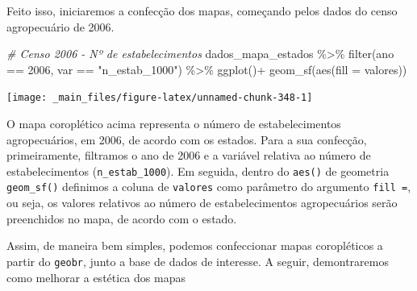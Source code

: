 \documentclass[
  brazilian,
]{book}
\newenvironment{Shaded}{\begin{snugshade}}{\end{snugshade}}
\newcommand{\AttributeTok}[1]{\textcolor[rgb]{0.77,0.63,0.00}{#1}}
\newcommand{\CommentTok}[1]{\textcolor[rgb]{0.56,0.35,0.01}{\textit{#1}}}
\newcommand{\DecValTok}[1]{\textcolor[rgb]{0.00,0.00,0.81}{#1}}
\newcommand{\FunctionTok}[1]{\textcolor[rgb]{0.00,0.00,0.00}{#1}}
\newcommand{\NormalTok}[1]{#1}
\newcommand{\SpecialCharTok}[1]{\textcolor[rgb]{0.00,0.00,0.00}{#1}}
\newcommand{\StringTok}[1]{\textcolor[rgb]{0.31,0.60,0.02}{#1}}
\begin{document}
Feito isso, iniciaremos a confecção dos mapas, começando pelos dados do censo agropecuário de 2006.

\begin{Shaded}
\begin{Highlighting}[]
\CommentTok{\# Censo 2006 {-} Nº de estabelecimentos}
\NormalTok{dados\_mapa\_estados }\SpecialCharTok{\%\textgreater{}\%} 
  \FunctionTok{filter}\NormalTok{(ano }\SpecialCharTok{==} \DecValTok{2006}\NormalTok{,}
\NormalTok{         var }\SpecialCharTok{==} \StringTok{"n\_estab\_1000"}\NormalTok{) }\SpecialCharTok{\%\textgreater{}\%} 
  \FunctionTok{ggplot}\NormalTok{()}\SpecialCharTok{+}
  \FunctionTok{geom\_sf}\NormalTok{(}\FunctionTok{aes}\NormalTok{(}\AttributeTok{fill =}\NormalTok{ valores))}
\end{Highlighting}
\end{Shaded}

\begin{center}\texttt{[image: \_main\_files/figure-latex/unnamed-chunk-348-1]} \end{center}

O mapa coroplético acima representa o número de estabelecimentos agropecuários, em 2006, de acordo com os estados. Para a sua confecção, primeiramente, filtramos o ano de 2006 e a variável relativa ao número de estabelecimentos (\texttt{n\_estab\_1000}). Em seguida, dentro do \texttt{aes()} de geometria \texttt{geom\_sf()} definimos a coluna de \texttt{valores} como parâmetro do argumento \texttt{fill\ =}, ou seja, os valores relativos ao número de estabelecimentos agropecuários serão preenchidos no mapa, de acordo com o estado.

Assim, de maneira bem simples, podemos confeccionar mapas coropléticos a partir do \texttt{geobr}, junto a base de dados de interesse. A seguir, demontraremos como melhorar a estética dos mapas
\end{document}
